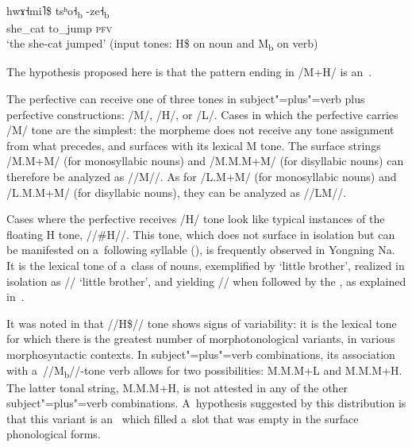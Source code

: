 \begin{exe}
	\ex
	\label{ex:shecatjumped}
	\\ 
		\gll hwɤ˧mi˥\$		tsʰo˧\textsubscript{b}	-ze˧\textsubscript{b}\\
		she\_cat	to\_jump	\textsc{pfv}\\
		\glt ‘the she-cat jumped’ (input tones: H\$ on noun and M\textsubscript{b} on verb)
\end{exe}
	
The hypothesis proposed here is that the pattern ending in /M+H/
is an~.

The {perfective} can receive one of three tones in subject"=plus"=verb plus {perfective} constructions: \mbox{/M/}, \mbox{/H/}, or \mbox{/L/}. Cases in which
the {perfective} carries \mbox{/M/} tone are the simplest: the morpheme does not receive any tone assignment from what
precedes, and surfaces with its lexical M tone. The surface strings \mbox{/M.M}+\mbox{M/} (for monosyllabic nouns) and \mbox{/M.M.M}+\mbox{M/} (for
disyllabic nouns) can therefore be analyzed as \mbox{//M//}. As for \mbox{/L.M}+\mbox{M/} (for monosyllabic nouns) and \mbox{/L.M.M}+\mbox{M/} (for
disyllabic nouns), they can be analyzed as \mbox{//LM//}. 

Cases where the {perfective} receives /H/ tone look like typical instances of the floating H tone, \mbox{//\#H//}. This
tone, which does not surface in isolation but can be manifested on a~following syllable (), is
frequently observed in Yongning Na. It is the lexical tone of a~class of nouns, exemplified by ‘little brother’, realized in isolation as // ‘little brother’, and yielding // when followed by the , as explained in~.

It was noted in  that \mbox{//H\$//} tone shows signs of variability: it is the lexical tone for
which there is the greatest number of morphotonological variants, in various
morphosyntactic contexts. In subject"=plus"=verb combinations, its association with a~\mbox{//M\textsubscript{b}//}-tone verb allows
for two possibilities: M.M.M+L and M.M.M+H. The latter tonal string, M.M.M+H, is not attested in any
of the other subject"=plus"=verb combinations. A~hypothesis suggested by this distribution is that this
variant is an~ which filled a~slot that was empty in the surface phonological forms.

